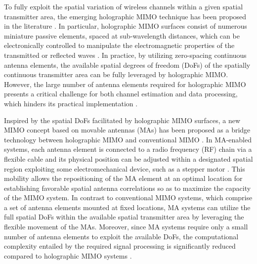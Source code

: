 \documentclass[12pt, draftclsnofoot, onecolumn]{IEEEtran}
\begin{document}
To fully exploit the spatial variation of wireless channels within a given spatial transmitter area, the emerging holographic MIMO technique has been proposed in the literature \cite{huang2020holographic}. In particular, holographic MIMO surfaces consist of numerous miniature passive elements, spaced at sub-wavelength distances, which can be electronically controlled to manipulate the electromagnetic properties of the transmitted or reflected waves \cite{xu2020resource}. In practice, by utilizing zero-spacing continuous antenna elements, the available spatial degrees of freedom (DoFs) of the spatially continuous transmitter area can be fully leveraged by holographic MIMO. However, the large number of antenna elements required for holographic MIMO presents a critical challenge for both channel estimation and data processing, which hinders its practical implementation \cite{huang2020holographic}. %

Inspired by the spatial DoFs facilitated by holographic MIMO surfaces, a new MIMO concept based on movable antennas (MAs) has been proposed as a bridge technology between holographic MIMO and conventional MIMO \cite{zhu2022modeling}. In MA-enabled systems, each antenna element is connected to a radio frequency (RF) chain via a flexible cable and its physical position can be adjusted within a designated spatial region exploiting some electromechanical device, such as a stepper motor \cite{ma2022mimo}. This mobility allows the repositioning of the MA element at an optimal location for establishing favorable spatial antenna correlations so as to maximize the capacity of the MIMO system. In contrast to conventional MIMO systems, which comprise a set of antenna elements mounted at fixed locations, MA systems can utilize the full spatial DoFs within the available spatial transmitter area by leveraging the flexible movement of the MAs. Moreover, since MA systems require only a small number of antenna elements to exploit the available DoFs, the computational complexity entailed by the required signal processing is significantly reduced compared to holographic MIMO systems \cite{zhu2022modeling,ma2022mimo,zhu2023movable}.
\end{document}
